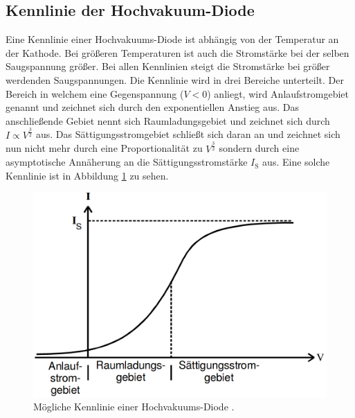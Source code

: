 \subsection{Kennlinie der Hochvakuum-Diode}
Eine Kennlinie einer Hochvakuums-Diode ist abhängig von der Temperatur an der Kathode. Bei größeren Temperaturen ist auch die Stromstärke bei der selben Saugspannung größer. Bei allen Kennlinien steigt die Stromstärke bei größer werdenden Saugspannungen. Die Kennlinie wird in drei Bereiche unterteilt. Der Bereich in welchem eine Gegenspannung ($V<0$) anliegt, wird Anlaufstromgebiet genannt und zeichnet sich durch den exponentiellen Anstieg aus. Das anschließende Gebiet nennt sich Raumladungsgebiet und zeichnet sich durch $I \propto V^\frac{3}{2}$ aus. Das Sättigungsstromgebiet schließt sich daran an und zeichnet sich nun nicht mehr durch eine Proportionalität zu $V^\frac{3}{2}$ sondern durch eine asymptotische Annäherung an die Sättigungsstromstärke $I_\text{S}$ aus. Eine solche Kennlinie ist in Abbildung \ref{fig:Kennlinie} zu sehen.
\begin{figure}
	\centering
	\includegraphics[width=\linewidth-150pt,height=\textheight-150pt,keepaspectratio]{content/Bilder/Kennlinie.png}
	\caption{Mögliche Kennlinie einer Hochvakuums-Diode \cite{V504}.}
	\label{fig:Kennlinie}
\end{figure}

